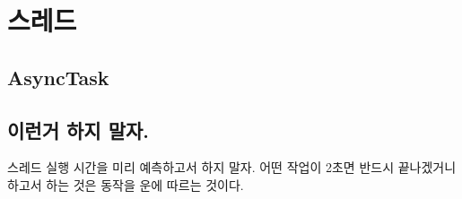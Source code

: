 \section{스레드}
\subsection{AsyncTask}

\subsection{이런거 하지 말자.}
스레드 실행 시간을 미리 예측하고서 하지 말자. 어떤 작업이 2초면 반드시 끝나겠거니 하고서 하는 것은 동작을 운에 따르는 것이다.
